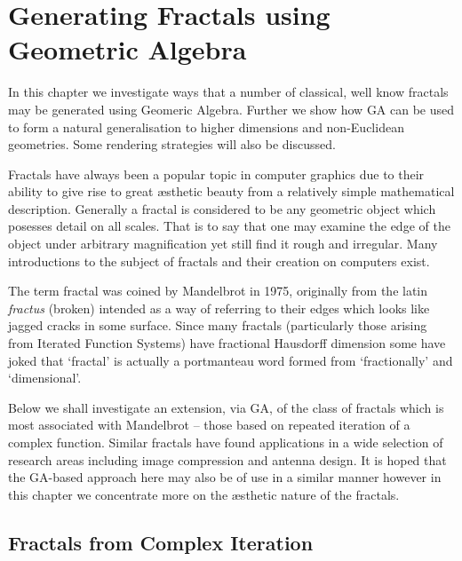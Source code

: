 \chapter{Generating Fractals using Geometric Algebra}

In this chapter we investigate ways that a number of classical, well know
fractals may be generated using Geomeric Algebra. Further we show how
GA can be used to form a natural generalisation to higher dimensions and
non-Euclidean geometries. Some rendering strategies will also be discussed.

Fractals have always been a popular topic in computer graphics due to their
ability to give rise to great \ae sthetic beauty from a relatively simple
mathematical description. Generally a fractal is considered to be any
geometric object which posesses detail on all
scales\cite{FRAC:FractalsEverywhere, FRAC:FractalGeometryOfNature}. That is to
say that one may examine the edge of the object under arbitrary magnification
yet still find it rough and irregular. Many introductions to the subject of
fractals and their creation on computers exist\cite{FRAC:FractalGeometry,
  FRAC:ChaosAndFractals, FRAC:FractalImages}.

The term fractal was coined by Mandelbrot\cite{FRAC:LesObjetsFractals} in 1975,
originally from the latin {\em fractus} (broken) intended as a way of referring
to their edges which looks like jagged cracks in some surface. Since many
fractals (particularly those arising from Iterated Function Systems) have
fractional Hausdorff dimension\cite{FRAC:GeometryOfFractalSets}
some have joked that `fractal' is actually a portmanteau word formed from
`fractionally' and `dimensional'.

Below we shall investigate an extension, via GA, of the class of fractals 
which is most associated with Mandelbrot -- those based on repeated iteration
of a complex function.  Similar fractals have found applications in a wide
selection of research areas including image compression\cite{Barnsley88b,Barnsley93b} and
antenna design\cite{FRAC:Antennas}. It is hoped that the GA-based approach here may
also be of use in a similar manner however in this chapter we concentrate more
on the \ae sthetic nature of the fractals.

\section{Fractals from Complex Iteration}

